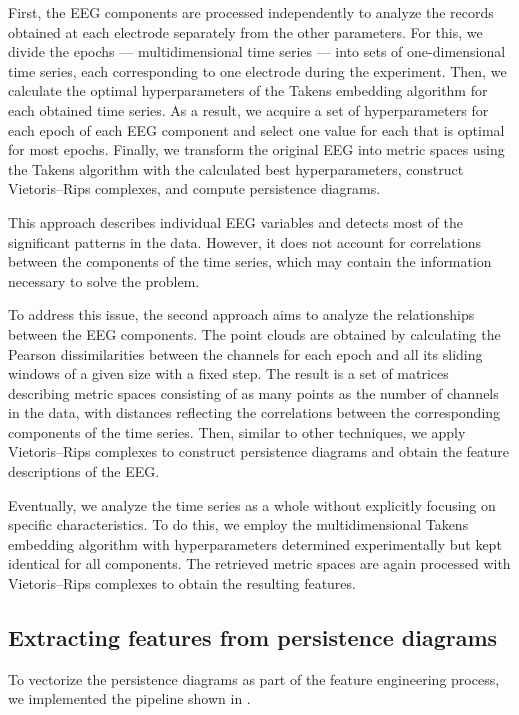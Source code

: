 \documentclass[10pt]{iopart}
\begin{document}
First, the EEG components are processed independently to analyze the records obtained at each electrode separately from the other parameters. For this, we divide the epochs --- multidimensional time series --- into sets of one-dimensional time series, each corresponding to one electrode during the experiment. Then, we calculate the optimal hyperparameters of the Takens embedding algorithm for each obtained time series. As a result, we acquire a set of hyperparameters for each epoch of each EEG component and select one value for each that is optimal for most epochs. Finally, we transform the original EEG into metric spaces using the Takens algorithm with the calculated best hyperparameters, construct Vietoris--Rips complexes, and compute persistence diagrams.

This approach describes individual EEG variables and detects most of the significant patterns in the data. However, it does not account for correlations between the components of the time series, which may contain the information necessary to solve the problem.

To address this issue, the second approach aims to analyze the relationships between the EEG components. The point clouds are obtained by calculating the Pearson dissimilarities between the channels for each epoch and all its sliding windows of a given size with a fixed step. The result is a set of matrices describing metric spaces consisting of as many points as the number of channels in the data, with distances reflecting the correlations between the corresponding components of the time series. Then, similar to other techniques, we apply Vietoris--Rips complexes to construct persistence diagrams and obtain the feature descriptions of the EEG.\@

Eventually, we analyze the time series as a whole without explicitly focusing on specific characteristics. To do this, we employ the multidimensional Takens embedding algorithm with hyperparameters determined experimentally but kept identical for all components. The retrieved metric spaces are again processed with Vietoris--Rips complexes to obtain the resulting features.

\subsection{Extracting features from persistence diagrams}

To vectorize the persistence diagrams as part of the feature engineering process, we implemented the pipeline shown in .
\end{document}
